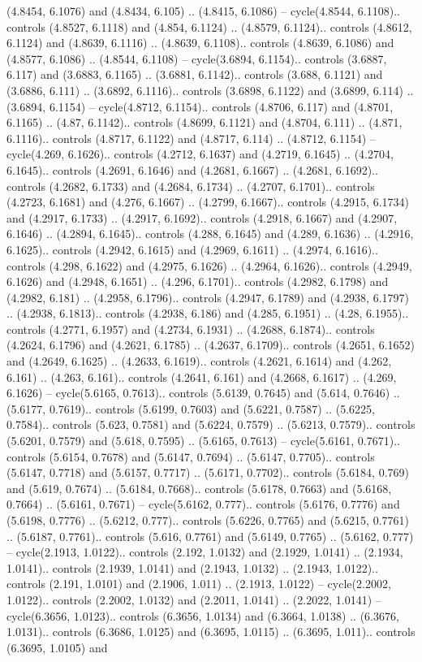 (4.8454, 6.1076) and (4.8434, 6.105) .. (4.8415, 6.1086) -- cycle(4.8544, 6.1108).. controls (4.8527, 6.1118) and (4.854, 6.1124) .. (4.8579, 6.1124).. controls (4.8612, 6.1124) and (4.8639, 6.1116) .. (4.8639, 6.1108).. controls (4.8639, 6.1086) and (4.8577, 6.1086) .. (4.8544, 6.1108) -- cycle(3.6894, 6.1154).. controls (3.6887, 6.117) and (3.6883, 6.1165) .. (3.6881, 6.1142).. controls (3.688, 6.1121) and (3.6886, 6.111) .. (3.6892, 6.1116).. controls (3.6898, 6.1122) and (3.6899, 6.114) .. (3.6894, 6.1154) -- cycle(4.8712, 6.1154).. controls (4.8706, 6.117) and (4.8701, 6.1165) .. (4.87, 6.1142).. controls (4.8699, 6.1121) and (4.8704, 6.111) .. (4.871, 6.1116).. controls (4.8717, 6.1122) and (4.8717, 6.114) .. (4.8712, 6.1154) -- cycle(4.269, 6.1626).. controls (4.2712, 6.1637) and (4.2719, 6.1645) .. (4.2704, 6.1645).. controls (4.2691, 6.1646) and (4.2681, 6.1667) .. (4.2681, 6.1692).. controls (4.2682, 6.1733) and (4.2684, 6.1734) .. (4.2707, 6.1701).. controls (4.2723, 6.1681) and (4.276, 6.1667) .. (4.2799, 6.1667).. controls (4.2915, 6.1734) and (4.2917, 6.1733) .. (4.2917, 6.1692).. controls (4.2918, 6.1667) and (4.2907, 6.1646) .. (4.2894, 6.1645).. controls (4.288, 6.1645) and (4.289, 6.1636) .. (4.2916, 6.1625).. controls (4.2942, 6.1615) and (4.2969, 6.1611) .. (4.2974, 6.1616).. controls (4.298, 6.1622) and (4.2975, 6.1626) .. (4.2964, 6.1626).. controls (4.2949, 6.1626) and (4.2948, 6.1651) .. (4.296, 6.1701).. controls (4.2982, 6.1798) and (4.2982, 6.181) .. (4.2958, 6.1796).. controls (4.2947, 6.1789) and (4.2938, 6.1797) .. (4.2938, 6.1813).. controls (4.2938, 6.186) and (4.285, 6.1951) .. (4.28, 6.1955).. controls (4.2771, 6.1957) and (4.2734, 6.1931) .. (4.2688, 6.1874).. controls (4.2624, 6.1796) and (4.2621, 6.1785) .. (4.2637, 6.1709).. controls (4.2651, 6.1652) and (4.2649, 6.1625) .. (4.2633, 6.1619).. controls (4.2621, 6.1614) and (4.262, 6.161) .. (4.263, 6.161).. controls (4.2641, 6.161) and (4.2668, 6.1617) .. (4.269, 6.1626) -- cycle(5.6165, 0.7613).. controls (5.6139, 0.7645) and (5.614, 0.7646) .. (5.6177, 0.7619).. controls (5.6199, 0.7603) and (5.6221, 0.7587) .. (5.6225, 0.7584).. controls (5.623, 0.7581) and (5.6224, 0.7579) .. (5.6213, 0.7579).. controls (5.6201, 0.7579) and (5.618, 0.7595) .. (5.6165, 0.7613) -- cycle(5.6161, 0.7671).. controls (5.6154, 0.7678) and (5.6147, 0.7694) .. (5.6147, 0.7705).. controls (5.6147, 0.7718) and (5.6157, 0.7717) .. (5.6171, 0.7702).. controls (5.6184, 0.769) and (5.619, 0.7674) .. (5.6184, 0.7668).. controls (5.6178, 0.7663) and (5.6168, 0.7664) .. (5.6161, 0.7671) -- cycle(5.6162, 0.777).. controls (5.6176, 0.7776) and (5.6198, 0.7776) .. (5.6212, 0.777).. controls (5.6226, 0.7765) and (5.6215, 0.7761) .. (5.6187, 0.7761).. controls (5.616, 0.7761) and (5.6149, 0.7765) .. (5.6162, 0.777) -- cycle(2.1913, 1.0122).. controls (2.192, 1.0132) and (2.1929, 1.0141) .. (2.1934, 1.0141).. controls (2.1939, 1.0141) and (2.1943, 1.0132) .. (2.1943, 1.0122).. controls (2.191, 1.0101) and (2.1906, 1.011) .. (2.1913, 1.0122) -- cycle(2.2002, 1.0122).. controls (2.2002, 1.0132) and (2.2011, 1.0141) .. (2.2022, 1.0141) -- cycle(6.3656, 1.0123).. controls (6.3656, 1.0134) and (6.3664, 1.0138) .. (6.3676, 1.0131).. controls (6.3686, 1.0125) and (6.3695, 1.0115) .. (6.3695, 1.011).. controls (6.3695, 1.0105) and 